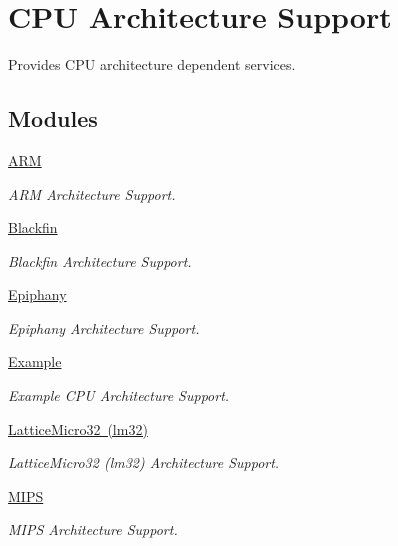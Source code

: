 \hypertarget{group__RTEMSScoreCPU}{}\section{C\+PU Architecture Support}
\label{group__RTEMSScoreCPU}


Provides C\+PU architecture dependent services.  


\subsection*{Modules}
\begin{DoxyCompactItemize}
\item 
\mbox{\hyperlink{group__RTEMSScoreCPUARM}{A\+RM}}
\begin{DoxyCompactList}\small\item\em A\+RM Architecture Support. \end{DoxyCompactList}\item 
\mbox{\hyperlink{group__RTEMSScoreCPUBfin}{Blackfin}}
\begin{DoxyCompactList}\small\item\em Blackfin Architecture Support. \end{DoxyCompactList}\item 
\mbox{\hyperlink{group__RTEMSScoreCPUEpiphany}{Epiphany}}
\begin{DoxyCompactList}\small\item\em Epiphany Architecture Support. \end{DoxyCompactList}\item 
\mbox{\hyperlink{group__RTEMSScoreCPUExample}{Example}}
\begin{DoxyCompactList}\small\item\em Example C\+PU Architecture Support. \end{DoxyCompactList}\item 
\mbox{\hyperlink{group__RTEMSScoreCPUlm32}{Lattice\+Micro32 (lm32)}}
\begin{DoxyCompactList}\small\item\em Lattice\+Micro32 (lm32) Architecture Support. \end{DoxyCompactList}\item 
\mbox{\hyperlink{group__RTEMSScoreCPUMIPS}{M\+I\+PS}}
\begin{DoxyCompactList}\small\item\em M\+I\+PS Architecture Support. \end{DoxyCompactList}\item 

\end{DoxyCompactItemize}

